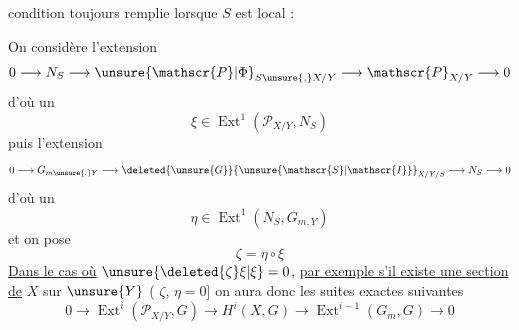 condition toujours remplie lorsque $S$ est local :

On considère l'extension
\[
0\longrightarrow N_S\longrightarrow{\unsure{\mathscr{P}|\Phi}}_{S{\unsure{,}}X/Y}\longrightarrow\mathscr{P}_{X/Y}\longrightarrow 0
\]
d'où un
\[
\xi\in\operatorname{Ext}^1(\mathscr{P}_{X/Y},N_S)
\]
puis l'extension
\[
0\longrightarrow G_{m{\unsure{,}}Y}\longrightarrow\deleted{{\unsure{G}}}{\unsure{\mathscr{S}|\mathscr{I}}}_{X/Y/S}\longrightarrow N_S\longrightarrow 0
\]
d'où un
\[
\eta\in\operatorname{Ext}^1(N_S,G_{m,Y})
\]
et on pose
\[
\zeta=\eta\circ\xi
\]
\uline{Dans le cas où} ${\unsure{\deleted{\zeta}\xi|\xi}}=0$, \uline{par exemple s'il existe une section de} $X$ sur ${\unsure{Y}}$ ({} {} $\zeta$, {} $\eta=0$] on aura donc les suites exactes {} suivantes
\[
\boxed{0\longrightarrow\operatorname{Ext}^i(\mathscr{P}_{X/Y},G)\longrightarrow H^i(X,G)\longrightarrow\operatorname{Ext}^{i-1}(G_m,G)\longrightarrow0}
\]

